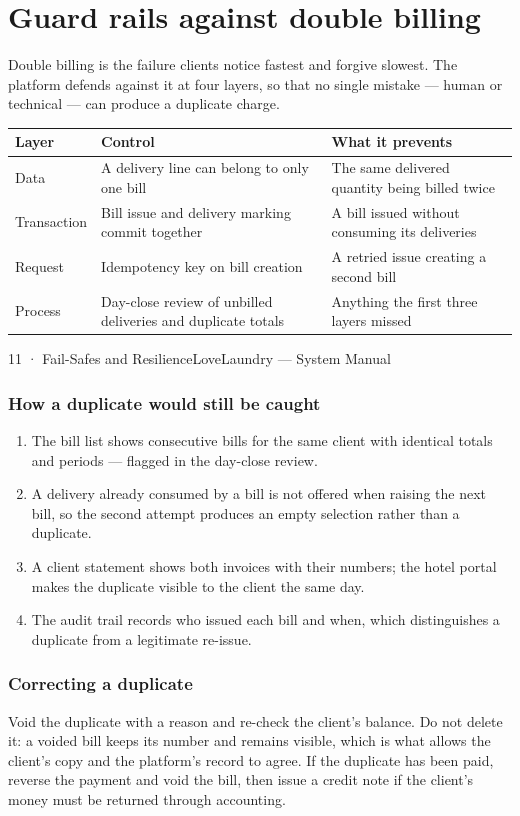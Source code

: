 \documentclass[11pt,a4paper,oneside]{book}
\begin{document}
\section*{Guard rails against double billing}
Double billing is the failure clients notice fastest and forgive slowest. The platform defends against it at four layers, so that no single mistake — human or technical — can produce a duplicate charge.

\begin{center}\small
\begin{tabularx}{\linewidth}{|X|X|X|}
\hline
\rowcolor{lightgrey}
\textbf{Layer} & \textbf{Control} & \textbf{What it prevents} \\ \hline
Data & A delivery line can belong to only one bill & The same delivered quantity being billed twice \\ \hline
Transaction & Bill issue and delivery marking commit together & A bill issued without consuming its deliveries \\ \hline
Request & Idempotency key on bill creation & A retried issue creating a second bill \\ \hline
Process & Day-close review of unbilled deliveries and duplicate totals & Anything the first three layers missed \\ \hline
\end{tabularx}
\end{center}
11 · Fail-Safes and ResilienceLoveLaundry — System Manual

\subsubsection*{How a duplicate would still be caught}
\begin{enumerate}
\item The bill list shows consecutive bills for the same client with identical totals and periods — flagged in the day-close review.
\item A delivery already consumed by a bill is not offered when raising the next bill, so the second attempt produces an empty selection rather than a duplicate.
\item A client statement shows both invoices with their numbers; the hotel portal makes the duplicate visible to the client the same day.
\item The audit trail records who issued each bill and when, which distinguishes a duplicate from a legitimate re-issue.
\end{enumerate}
\subsubsection*{Correcting a duplicate}
Void the duplicate with a reason and re-check the client's balance. Do not delete it: a voided bill keeps its number and remains visible, which is what allows the client's copy and the platform's record to agree. If the duplicate has been paid, reverse the payment and void the bill, then issue a credit note if the client's money must be returned through accounting.
\end{document}
